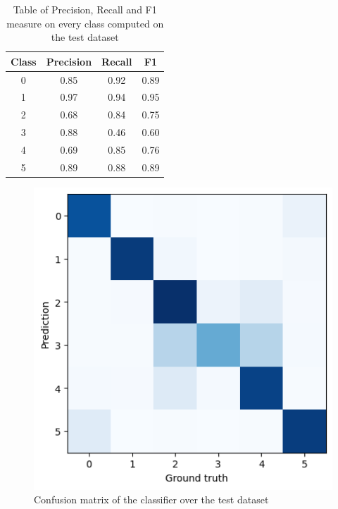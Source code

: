 \documentclass[12pt,journal,compsoc]{IEEEtran}
\begin{document}
\begin{table}[ht]
	\centering
	\begin{tabular}{c c c c }
		Class & Precision & Recall & F1  \\
		\hline
		0 & 0.85 & 0.92 &0.89     \\
		1 & 0.97 & 0.94 &0.95       \\
		2 & 0.68 &0.84  &0.75       \\
		3 & 0.88 &0.46  &0.60       \\ 
		4 & 0.69 &0.85  &0.76       \\
		5 & 0.89 & 0.88 &0.89       \\
		
	\end{tabular}
	\caption{Table of Precision, Recall and F1 measure on every class computed on the test dataset}
	\end{table}
	\begin{figure}[H]
		\begin{center}
		\includegraphics[scale=.75]{./images/confmat_vgg16.png}
		\end{center}
		\caption{Confusion matrix of the classifier over the test dataset}
	\end{figure}
\end{document}
